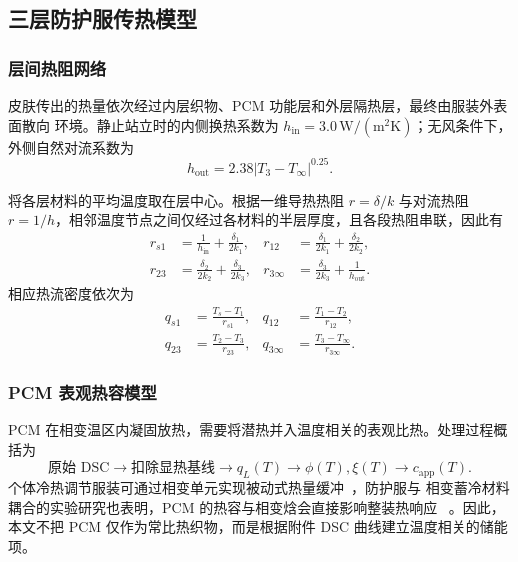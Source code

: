 \documentclass[withoutpreface,bwprint]{cumcmthesis}
\begin{document}
\subsection{三层防护服传热模型}

\subsubsection{层间热阻网络}

皮肤传出的热量依次经过内层织物、PCM 功能层和外层隔热层，最终由服装外表面散向
环境。静止站立时的内侧换热系数为
$h_{\mathrm{in}}=3.0\,\mathrm{W/(m^2K)}$；无风条件下，外侧自然对流系数为
\[
h_{\mathrm{out}}=2.38|T_3-T_\infty|^{0.25}.
\]

将各层材料的平均温度取在层中心。根据一维导热热阻 $r=\delta/k$ 与对流热阻
$r=1/h$，相邻温度节点之间仅经过各材料的半层厚度，且各段热阻串联，因此有
\begin{equation}
\begin{aligned}
r_{s1}&=\frac{1}{h_{\mathrm{in}}}+\frac{\delta_1}{2k_1},&
r_{12}&=\frac{\delta_1}{2k_1}+\frac{\delta_2}{2k_2},\\
r_{23}&=\frac{\delta_2}{2k_2}+\frac{\delta_3}{2k_3},&
r_{3\infty}&=\frac{\delta_3}{2k_3}+\frac{1}{h_{\mathrm{out}}}.
\end{aligned}
\label{eq:q1-thermal-resistances}
\end{equation}
相应热流密度依次为
\begin{equation}
\begin{aligned}
q_{s1}&=\frac{T_s-T_1}{r_{s1}},&
q_{12}&=\frac{T_1-T_2}{r_{12}},\\
q_{23}&=\frac{T_2-T_3}{r_{23}},&
q_{3\infty}&=\frac{T_3-T_\infty}{r_{3\infty}}.
\end{aligned}
\label{eq:q1-heat-fluxes}
\end{equation}


\subsubsection{PCM 表观热容模型}

PCM 在相变温区内凝固放热，需要将潜热并入温度相关的表观比热。处理过程概括为
\[
\text{原始 DSC}\longrightarrow\text{扣除显热基线}
\longrightarrow q_L(T)\longrightarrow \phi(T),\xi(T)
\longrightarrow c_{\mathrm{app}}(T).
\]
个体冷热调节服装可通过相变单元实现被动式热量缓冲~\cite{chen2024ptrc}，防护服与
相变蓄冷材料耦合的实验研究也表明，PCM 的热容与相变焓会直接影响整装热响应
~\cite{cao2024pcmclothing}。因此，本文不把 PCM 仅作为常比热织物，而是根据附件 DSC
曲线建立温度相关的储能项。
\end{document}
